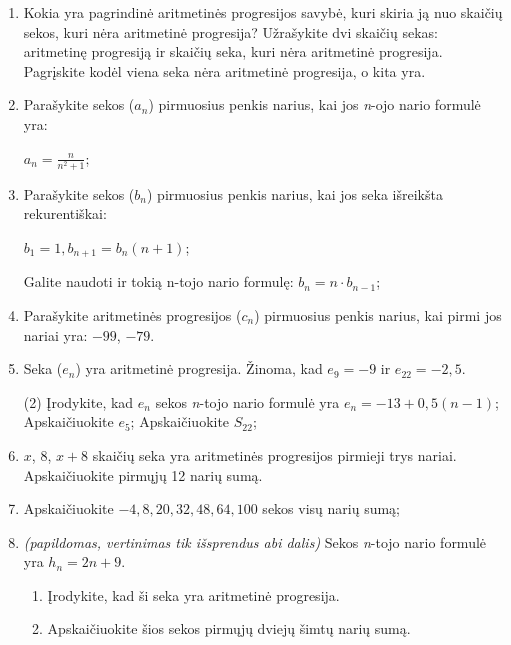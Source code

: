 \documentclass[a4paper]{article}
\begin{document}
\begin{enumerate}
      \item Kokia yra pagrindinė aritmetinės progresijos savybė, kuri skiria ją
            nuo skaičių sekos, kuri nėra aritmetinė progresija? Užrašykite dvi
            skaičių sekas: aritmetinę progresiją ir skaičių seka, kuri nėra
            aritmetinė progresija. Pagrįskite kodėl viena seka nėra
            aritmetinė progresija, o kita yra.

      \item Parašykite sekos ($a_{n}$) pirmuosius penkis
            narius, kai jos \textit{n}-ojo nario formulė yra:

            $a_{n}=\frac{n}{n^{2} + 1}$;

      \item Parašykite sekos ($b_{n}$) pirmuosius penkis
            narius, kai jos seka išreikšta rekurentiškai:

            $b_1 = 1, b_{n+1}=b_{n}(n+1)$;

            Galite naudoti ir tokią n-tojo nario formulę: $b_{n}=n \cdot
                  b_{n-1}$;

      \item Parašykite aritmetinės progresijos ($c_{n}$) pirmuosius penkis
            narius, kai pirmi jos nariai yra: $-99$, $-79$.

      \item Seka ($e_{n}$) yra aritmetinė progresija. Žinoma, kad $e_{9}=-9$ ir
            $e_{22}=-2,5$.

            \begin{tasks}[item-format={\normalfont}, after-item-skip=2mm](2)
                  \task* Įrodykite, kad $e_{n}$ sekos \textit{n}-tojo nario
                  formulė yra $e_{n}=-13+0,5(n-1)$;
                  \task Apskaičiuokite $e_{5}$;
                  \task Apskaičiuokite $S_{22}$;
            \end{tasks}

      \item $ x $, $ 8 $, $ x + 8$ skaičių seka yra aritmetinės progresijos
            pirmieji trys nariai. Apskaičiuokite pirmųjų 12 narių sumą.

      \item Apskaičiuokite $ -4, 8, 20, 32, 48, 64, 100 $ sekos visų narių sumą;

      \item \textit{(papildomas, vertinimas tik išsprendus abi dalis)} Sekos
            \textit{n}-tojo nario formulė yra
            $h_{n} = 2n+9$.
            \begin{enumerate}[label= (\alph*)]
                  \item Įrodykite, kad ši seka yra aritmetinė progresija.
                  \item Apskaičiuokite šios sekos pirmųjų dviejų šimtų narių
                        sumą.
            \end{enumerate}
\end{enumerate}
\end{document}
